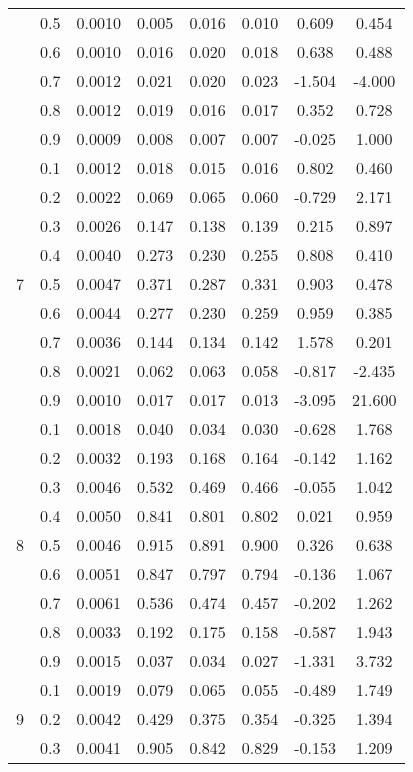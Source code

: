 \documentclass[11pt,a4paper]{report}
\begin{document}
\begin{longtable}{ | c | c || c | c | c | c | c | c | }
 & 0.5 & 0.0010 & 0.005 & 0.016 & 0.010 & 0.609 & 0.454 \\
 & 0.6 & 0.0010 & 0.016 & 0.020 & 0.018 & 0.638 & 0.488 \\
 & 0.7 & 0.0012 & 0.021 & 0.020 & 0.023 & -1.504 & -4.000 \\
 & 0.8 & 0.0012 & 0.019 & 0.016 & 0.017 & 0.352 & 0.728 \\
 & 0.9 & 0.0009 & 0.008 & 0.007 & 0.007 & -0.025 & 1.000 \\
 \hline
\multirow{9}{*}{7} & 0.1 & 0.0012 & 0.018 & 0.015 & 0.016 & 0.802 & 0.460 \\
 & 0.2 & 0.0022 & 0.069 & 0.065 & 0.060 & -0.729 & 2.171 \\
 & 0.3 & 0.0026 & 0.147 & 0.138 & 0.139 & 0.215 & 0.897 \\
 & 0.4 & 0.0040 & 0.273 & 0.230 & 0.255 & 0.808 & 0.410 \\
 & 0.5 & 0.0047 & 0.371 & 0.287 & 0.331 & 0.903 & 0.478 \\
 & 0.6 & 0.0044 & 0.277 & 0.230 & 0.259 & 0.959 & 0.385 \\
 & 0.7 & 0.0036 & 0.144 & 0.134 & 0.142 & 1.578 & 0.201 \\
 & 0.8 & 0.0021 & 0.062 & 0.063 & 0.058 & -0.817 & -2.435 \\
 & 0.9 & 0.0010 & 0.017 & 0.017 & 0.013 & -3.095 & 21.600 \\
 \hline
\multirow{9}{*}{8} & 0.1 & 0.0018 & 0.040 & 0.034 & 0.030 & -0.628 & 1.768 \\
 & 0.2 & 0.0032 & 0.193 & 0.168 & 0.164 & -0.142 & 1.162 \\
 & 0.3 & 0.0046 & 0.532 & 0.469 & 0.466 & -0.055 & 1.042 \\
 & 0.4 & 0.0050 & 0.841 & 0.801 & 0.802 & 0.021 & 0.959 \\
 & 0.5 & 0.0046 & 0.915 & 0.891 & 0.900 & 0.326 & 0.638 \\
 & 0.6 & 0.0051 & 0.847 & 0.797 & 0.794 & -0.136 & 1.067 \\
 & 0.7 & 0.0061 & 0.536 & 0.474 & 0.457 & -0.202 & 1.262 \\
 & 0.8 & 0.0033 & 0.192 & 0.175 & 0.158 & -0.587 & 1.943 \\
 & 0.9 & 0.0015 & 0.037 & 0.034 & 0.027 & -1.331 & 3.732 \\
 \hline
\multirow{9}{*}{9} & 0.1 & 0.0019 & 0.079 & 0.065 & 0.055 & -0.489 & 1.749 \\
 & 0.2 & 0.0042 & 0.429 & 0.375 & 0.354 & -0.325 & 1.394 \\
 & 0.3 & 0.0041 & 0.905 & 0.842 & 0.829 & -0.153 & 1.209 \\

\end{longtable}
\end{document}
